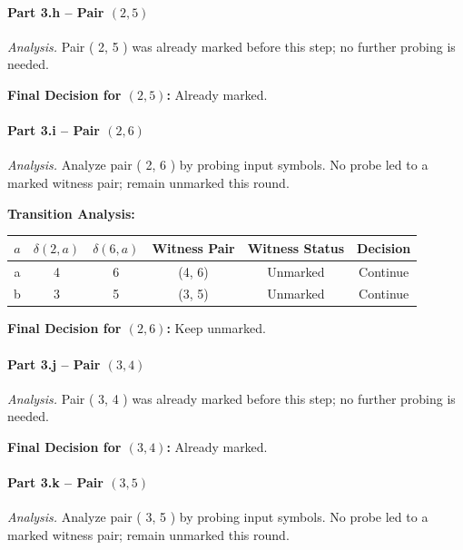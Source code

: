 \documentclass{article}
\begin{document}
\paragraph{Part 3.h \;–\; Pair $( 2, 5 )$}

\emph{Analysis.} Pair ( 2, 5 ) was already marked before this step; no further probing is needed.

\noindent\textbf{Final Decision for $( 2, 5 )$:} Already marked.

\vspace{0.75em}
\paragraph{Part 3.i \;–\; Pair $( 2, 6 )$}

\emph{Analysis.} Analyze pair ( 2, 6 ) by probing input symbols. No probe led to a marked witness pair; remain unmarked this round.

\noindent\textbf{Transition Analysis:}
\begin{center}
\begin{tabular}{c c c c c c}
\hline
$a$ & $\delta(2,a)$ & $\delta(6,a)$ & Witness Pair & Witness Status & Decision \\
\hline
a & 4 & 6 &
(4, 6) &
Unmarked &
Continue \\
b & 3 & 5 &
(3, 5) &
Unmarked &
Continue \\
\hline
\end{tabular}
\end{center}



\noindent\textbf{Final Decision for $( 2, 6 )$:} Keep unmarked.

\vspace{0.75em}
\paragraph{Part 3.j \;–\; Pair $( 3, 4 )$}

\emph{Analysis.} Pair ( 3, 4 ) was already marked before this step; no further probing is needed.

\noindent\textbf{Final Decision for $( 3, 4 )$:} Already marked.

\vspace{0.75em}
\paragraph{Part 3.k \;–\; Pair $( 3, 5 )$}

\emph{Analysis.} Analyze pair ( 3, 5 ) by probing input symbols. No probe led to a marked witness pair; remain unmarked this round.
\end{document}
